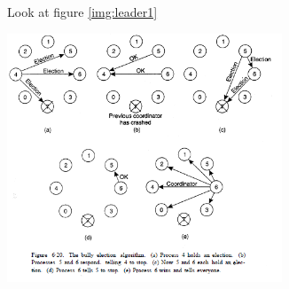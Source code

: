 Look at figure \ref{img:leader1}
\begin{minipage}{\linewidth}
	\centering\includegraphics[width=310px]{gfx/leader1.png}
	\label{img:leader1}
\end{minipage}


